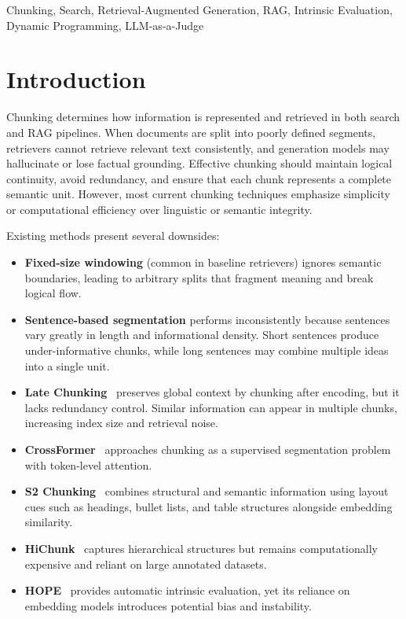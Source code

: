 \documentclass[conference]{IEEEtran}
\begin{document}
\begin{IEEEkeywords}
Chunking, Search, Retrieval-Augmented Generation, RAG, Intrinsic Evaluation,
Dynamic Programming, LLM-as-a-Judge
\end{IEEEkeywords}

\section{Introduction}

Chunking determines how information is represented and retrieved in both
search and RAG pipelines. When documents are split into poorly defined
segments, retrievers cannot retrieve relevant text consistently, and
generation models may hallucinate or lose factual grounding. Effective
chunking should maintain logical continuity, avoid redundancy, and ensure
that each chunk represents a complete semantic unit. However, most current
chunking techniques emphasize simplicity or computational efficiency over
linguistic or semantic integrity.

Existing methods present several downsides:
\begin{itemize}
    \item \textbf{Fixed-size windowing} (common in baseline retrievers)
    ignores semantic boundaries, leading to arbitrary splits that fragment
    meaning and break logical flow.
    \item \textbf{Sentence-based segmentation} performs inconsistently
    because sentences vary greatly in length and informational density.
    Short sentences produce under-informative chunks, while long sentences
    may combine multiple ideas into a single unit.
    \item \textbf{Late Chunking}~\cite{gunther2024late} preserves global
    context by chunking after encoding, but it lacks redundancy control.
    Similar information can appear in multiple chunks, increasing index
    size and retrieval noise.
    \item \textbf{CrossFormer}~\cite{ni2025crossformer} approaches chunking
    as a supervised segmentation problem with token-level attention.
    \item \textbf{S2 Chunking}~\cite{verma2025s2} combines structural and
    semantic information using layout cues such as headings, bullet lists,
    and table structures alongside embedding similarity.
    \item \textbf{HiChunk}~\cite{lu2025hichunk} captures hierarchical
    structures but remains computationally expensive and reliant on large
    annotated datasets.
    \item \textbf{HOPE}~\cite{bradland2025hope} provides automatic
    intrinsic evaluation, yet its reliance on embedding models introduces
    potential bias and instability.
\end{itemize}
\end{document}
